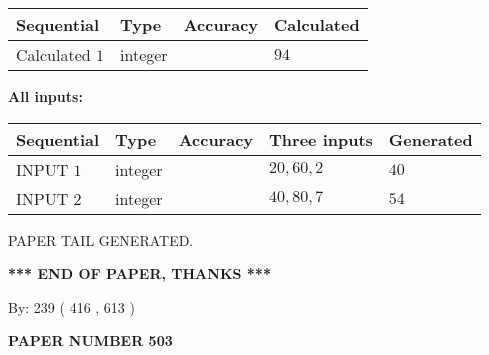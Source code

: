 \documentclass[12pt]{article}
\begin{document}
   
   
   
\noindent{}
   
   
  
  
\noindent\begin{tabular}{|l|l|l|l|}
\hline
 Sequential & Type & Accuracy & Calculated \\ 
\hline
 
 
  Calculated $  1 $ & integer &  & 
  $ 94 $ 
 \\  \hline  
 \end{tabular}
   
   
   
   
\noindent\vspace{0.1in}\hspace{-0.08in} {\textbf{\Large{All inputs: }}}
   
   
  
  
\noindent\begin{tabular}{|l|l|l|l|l|}
\hline
 Sequential & Type & Accuracy & Three inputs & Generated \\ 
\hline
 
 
  INPUT $  1 $ & integer &  & $
 20
 , 
 60
 , 
 2
 $ & $ 40 $ 
 \\  \hline  
 
 
  INPUT $  2 $ & integer &  & $
 40
 , 
 80
 , 
 7
 $ & $ 54 $ 
 \\  \hline  
 \end{tabular}
   
   
   
   
   
   
 \vspace{0.2in}
 
   
   
\vspace{2.0in} PAPER TAIL GENERATED.
   
   
   
   
\vspace{1.0in} 
{\textbf{\large{ *** END OF PAPER, THANKS *** }}} 
   
   
\hspace{1.0in} By: 
 239 ( 416 ,  613 )
   
   
   
   
\newpage 
\setcounter{page}{ 
   503001 } 
   
   
   
   
 {\textbf{ \Large{ PAPER NUMBER  503  }}}
   
\end{document}
